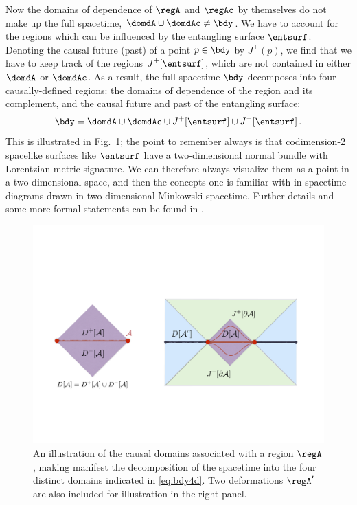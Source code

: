 \documentclass[12pt,openany]{book}
\begin{document}
Now the domains of dependence of $\regA$ and $\regAc$ by themselves do not make up the full spacetime, $\domdA \cup \domdAc\neq \bdy$. We have to account for the regions which can be influenced by the entangling surface $\entsurf$. Denoting the causal  future (past) of a point $p\in\bdy$ by $J^\pm(p)$,  we find that we have to keep track of the regions $J^\pm[\entsurf]$, which are not contained in either $\domdA$ or $\domdAc$. As a result, the  full spacetime $\bdy$ decomposes into four causally-defined regions: the domains of dependence of the region and its complement, and the causal future and past of the entangling surface:
%
\begin{equation}
\bdy = \domdA \cup \domdAc \cup J^+[\entsurf] \cup J^-[\entsurf]\,.
\label{eq:bdy4d}
\end{equation}
%
This is illustrated in  Fig.~\ref{f:bdy4d}; the point to remember always is that codimension-2 spacelike surfaces like $\entsurf$ have a two-dimensional normal bundle with Lorentzian metric signature. We can therefore always visualize them as a point in a two-dimensional space, and then the concepts one is familiar with in spacetime diagrams drawn in two-dimensional Minkowski spacetime. Further details and some more formal statements can be found in \cite{Headrick:2014cta}.

\begin{figure}
\begin{center}
\includegraphics[width=5in]{figures/bdydomains}
\setlength{\unitlength}{0.1\columnwidth}
\caption{
An illustration of the causal domains associated with a region $\regA$, making manifest the decomposition of the spacetime into the four distinct domains indicated in \eqref{eq:bdy4d}.
Two deformations $\regA'$ are also included for illustration in the right panel.
}
\label{f:bdy4d}
\end{center}
\end{figure}
%
\end{document}
